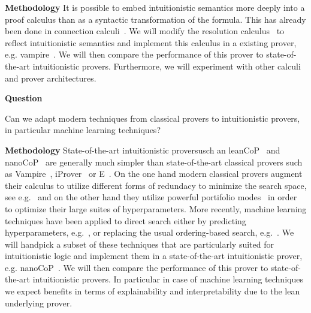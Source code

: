 \documentclass{article}
\theoremstyle{definition}
\theoremstyle{definition}
\theoremstyle{definition}
\theoremstyle{definition}
\theoremstyle{definition}
\theoremstyle{definition}
\theoremstyle{definition}
\newcommand{\0}{\mathbf 0}
\newcommand{\1}{\mathbf 1}
\newcounter{question}
\newenvironment{question}{\smallskip\noindent\textbf{Question \refstepcounter{question}\arabic{question}}\begin{em}}{\end{em}}
\newenvironment{method}{\smallskip\noindent\textbf{Methodology}}{}
\begin{document}
	\begin{method}
		It is possible to embed intuitionistic semantics more deeply into a proof calculus than as a syntactic transformation of the formula. This has already been done in connection calculi~\cite{otten2005clausal}. We will modify the resolution calculus~\cite{bachmair2001resolution} to reflect intuitionistic semantics and implement this calculus in a existing prover, e.g. vampire~\cite{kovacs2013first}. We will then compare the performance of this prover to state-of-the-art intuitionistic provers. Furthermore, we will experiment with other calculi and prover architectures.
	\end{method}

	\vspace*{12pt}

	\begin{question}
		Can we adapt modern techniques from classical provers to intuitionistic provers, in particular machine learning techniques?
	\end{question}

	\begin{method}
		State-of-the-art intuitionistic proversusch an leanCoP~\cite{otten2008leancop} and nanoCoP~\cite{otten2021nanocop} are generally much simpler than state-of-the-art classical provers such as Vampire~\cite{kovacs2013first}, iProver~\cite{korovin2008iprover} or E~\cite{schulz2002brainiac}. On the one hand modern classical provers augment their calculus to utilize different forms of redundacy to minimize the search space, see e.g.~\cite{bbachmair1994rewrite,hillenbrand2013search, gleiss2020subsumption} and on the other hand they utilize powerful portifolio modes~\cite{rawson2018dynamic} in order to optimize their large suites of hyperparameters. More recently, machine learning techniques have been applied to direct search either by predicting hyperparameters, e.g.~\cite{bartek2020learning,bartek2023much}, or replacing the usual ordering-based search, e.g.~\cite{jakubuuv2017enigma,kaliszyk2018reinforcement,crouse2021deep}. We will handpick a subset of these techniques that are particularly suited for intuitionistic logic and implement them in a state-of-the-art intuitionistic prover, e.g. nanoCoP~\cite{otten2021nanocop}. We will then compare the performance of this prover to state-of-the-art intuitionistic provers. In particular in case of machine learning techniques we expect benefits in terms of explainability and interpretability due to the lean underlying prover.
	\end{method}
\end{document}
